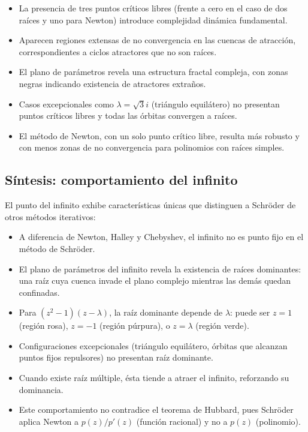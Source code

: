 \begin{itemize}
\item La presencia de tres puntos críticos libres (frente a cero en el caso de dos raíces y uno para Newton) introduce complejidad dinámica fundamental.

\item Aparecen regiones extensas de no convergencia en las cuencas de atracción, correspondientes a ciclos atractores que no son raíces.

\item El plano de parámetros revela una estructura fractal compleja, con zonas negras indicando existencia de atractores extraños.

\item Casos excepcionales como $\lambda=\sqrt{3}i$ (triángulo equilátero) no presentan puntos críticos libres y todas las órbitas convergen a raíces.

\item El método de Newton, con un solo punto crítico libre, resulta más robusto y con menos zonas de no convergencia para polinomios con raíces simples.
\end{itemize}

\subsection{Síntesis: comportamiento del infinito}

El punto del infinito exhibe características únicas que distinguen a Schröder de otros métodos iterativos:

\begin{itemize}
\item A diferencia de Newton, Halley y Chebyshev, el infinito no es punto fijo en el método de Schröder.

\item El plano de parámetros del infinito revela la existencia de raíces dominantes: una raíz cuya cuenca invade el plano complejo mientras las demás quedan confinadas.

\item Para $(z^2-1)(z-\lambda)$, la raíz dominante depende de $\lambda$: puede ser $z=1$ (región rosa), $z=-1$ (región púrpura), o $z=\lambda$ (región verde).

\item Configuraciones excepcionales (triángulo equilátero, órbitas que alcanzan puntos fijos repulsores) no presentan raíz dominante.

\item Cuando existe raíz múltiple, ésta tiende a atraer el infinito, reforzando su dominancia.

\item Este comportamiento no contradice el teorema de Hubbard, pues Schröder aplica Newton a $p(z)/p'(z)$ (función racional) y no a $p(z)$ (polinomio).
\end{itemize}

